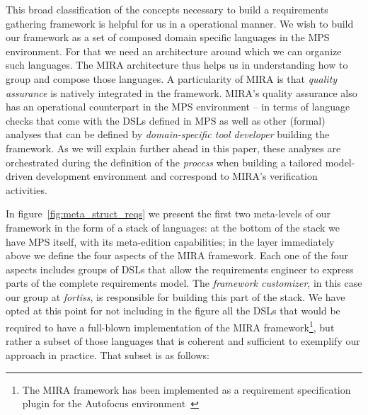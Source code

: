 This broad classification of the concepts necessary to build a requirements
gathering framework is helpful for us in a operational manner. We wish to build
our framework as a set of composed domain specific languages in the MPS
environment. For that we need an architecture around which we can organize such
languages. The MIRA architecture thus helps us in understanding how to group and
compose those languages. A particularity of MIRA is that \emph{quality
assurance} is natively integrated in the framework. MIRA's quality assurance
also has an operational counterpart in the MPS environment -- in terms of
language checks that come with the DSLs defined in MPS as well as other (formal)
analyses that can be defined by \emph{domain-specific tool developer} building
the framework. As we will explain further ahead in this paper, these analyses
are orchestrated during the definition of the \emph{process} when building a
tailored model-driven development environment and correspond to MIRA's verification activities.

In figure~\ref{fig:meta_struct_reqs} we present the first two meta-levels of our
framework in the form of a stack of languages: at the bottom of the stack we
have MPS itself, with its meta-edition capabilities; in the layer immediately
above we define the four aspects of the MIRA framework. Each one of the four
aspects includes groups of DSLs that allow the requirements engineer to express
parts of the complete requirements model. The \emph{framework customizer}, in
this case our group at \emph{fortiss}, is responsible for building this part of
the stack. We have opted at this point for not including in the figure all the
DSLs that would be required to have a full-blown implementation of the MIRA
framework\footnote{The MIRA framework has been implemented as a requirement
specification plugin for the Autofocus environment~\cite{AF315}}, but rather a
subset of those languages that is coherent and sufficient to exemplify our
approach in practice. That subset is as follows:

